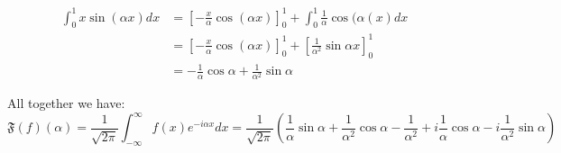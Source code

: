 \documentclass[11pt]{article}
\begin{document}
\begin{solution}
$$\begin{aligned} \int_0^1 x \sin (\alpha x) d x & =\left[-\frac{x}{\alpha} \cos (\alpha x)\right]_0^1+\int_0^1 \frac{1}{\alpha} \cos (\alpha(x) d x \\ & =\left[-\frac{x}{\alpha} \cos (\alpha x)\right]_0^1+\left[\frac{1}{\alpha^2} \sin \alpha x\right]_0^1 \\ & =-\frac{1}{\alpha} \cos \alpha+\frac{1}{\alpha^2} \sin \alpha\end{aligned}$$

All together we have:
$$
\mathfrak{F}(f)(\alpha)=\frac{1}{\sqrt{2 \pi}} \int_{-\infty}^{\infty} f(x) e^{-i \alpha x} d x = \frac{1}{\sqrt{2\pi}}\left(\frac{1}{\alpha} \sin \alpha+\frac{1}{\alpha^2} \cos \alpha-\frac{1}{\alpha^2} +i\frac{1}{\alpha} \cos \alpha-i\frac{1}{\alpha^2} \sin \alpha\right)
$$
\end{solution}
\end{document}
